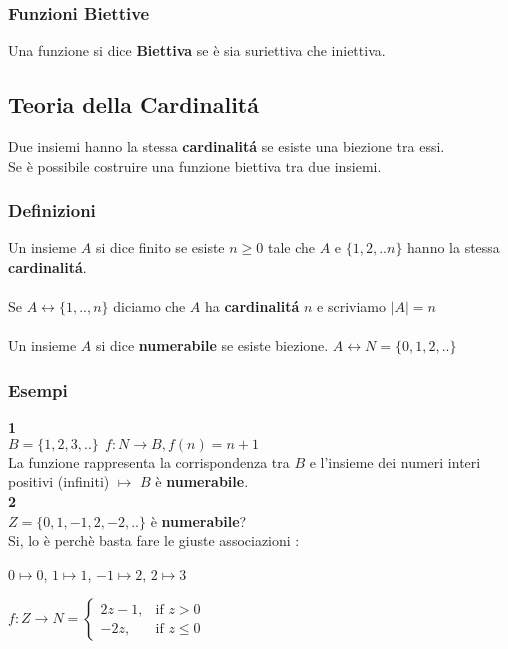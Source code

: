 \documentclass[11pt]{article}
\begin{document}
        \subsubsection{Funzioni Biettive}
            Una funzione si dice \textbf{Biettiva} se \`e sia suriettiva che iniettiva.
    \subsection{Teoria della Cardinalit\'a}
        Due insiemi hanno la stessa \textbf{cardinalit\'a} se esiste una biezione tra essi.\\
        Se \`e possibile costruire una funzione biettiva tra due insiemi.
        \subsubsection{Definizioni}
            Un insieme $A$ si dice finito se esiste $n \geq 0$ tale che $A$ e $\{1,2,..n\}$ hanno la stessa \textbf{cardinalit\'a}.  \\
            \\
            Se $A \longleftrightarrow \{1,..,n\}$ diciamo che $A$ ha \textbf{cardinalit\'a} $n$ e scriviamo  
            $|A|  =  n $ 
            \\
            \\
            Un insieme $A$ si dice \textbf{numerabile} se esiste biezione. 
            $A \longleftrightarrow N = \{0,1,2,..\}$
        \subsubsection{Esempi}
            \textbf{\large 1}\\
            $B=\{1,2,3,..\} \ \ f:N\to B , f(n)=n+1 $ \\
            La funzione rappresenta la corrispondenza tra $B$ e l'insieme dei numeri interi positivi (infiniti) $\mapsto$ $B$ \`e \textbf{numerabile}.\\
            \textbf{\large 2}\\
            $Z=\{0,1,-1,2,-2,..\}$ \`e \textbf{numerabile}? \\
            Si, lo \`e perch\`e basta fare le giuste associazioni :

            $0\mapsto 0 $, $1\mapsto1$, $-1\mapsto2$, $2\mapsto3$

            $f:Z\to N = 
			 \begin{cases}
				 2z-1, &\mbox{if } z>0\\
				-2z, &\mbox{if } z \leq 0
			 \end{cases}$
\end{document}

